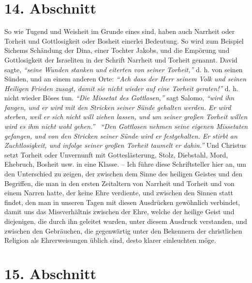 \section{14. Abschnitt} \label{kap9_ab14}

So wie Tugend und Weisheit im Grunde eines sind, haben auch Narrheit oder
Torheit und Gottlosigkeit oder Bosheit einerlei Bedeutung. So wird zum Beispiel
Sichems Schändung der Dina, einer
Tochter Jakobs, und die Empörung und
Gottlosigkeit der Israeliten in der Schrift Narrheit
und Torheit
genannt.
David sagte,
\textit{"`seine Wunden stanken
und eiterten von seiner Torheit,"'}
d. h. von seinen Sünden,
und an einem anderen Orte:
\textit{"`Ach dass der Herr seinem Volk und seinen Heiligen
Frieden zusagt, damit sie nicht wieder auf eine Torheit
geraten!"'}
d. h. nicht wieder Böses tun.
\textit{"`Die Missetat des Gottlosen,"'}
sagt Salomo,
\textit{"`wird ihn fangen, und er wird mit den Stricken
seiner Sünde gehalten werden. Er wird sterben, weil er sich nicht
will ziehen lassen, und um seiner großen Torheit willen wird es ihm nicht wohl
gehen."'}~ \textit{"`Den Gottlosen nehmen seine eigenen Missetaten gefangen,
und von den Stricken seiner Sünde wird er festgehalten. Er stirbt an
Zuchtlosigkeit, und infolge seiner großen Torheit taumelt er dahin."'}
Und Christus setzt Torheit oder
Unvernunft mit Gotteslästerung, Stolz, Diebstahl, Mord, Ehebruch, Bosheit usw.
in eine Klasse. -- Ich führe diese Schriftsteller hier an, um den
Unterschied zu zeigen, der zwischen dem Sinne des heiligen Geistes und den
Begriffen, die man in den ersten Zeitaltern von Narrheit und Torheit und von
einem Narren hatte, der keine Ehre verdiente, und zwischen den Sinnen statt
findet, den man in unseren Tagen mit diesen Ausdrücken gewöhnlich verbindet,
damit uns das Missverhältnis zwischen der Ehre, welche der heilige Geist und
diejenigen, die durch ihn geleitet wurden, unter diesem Ausdruck verstanden,
und zwischen den Gebräuchen, die gegenwärtig unter den Bekennern der
christlichen Religion als Ehrerweisungen üblich sind, desto klarer einleuchten
möge.

\section{15. Abschnitt} \label{kap9_ab15}

